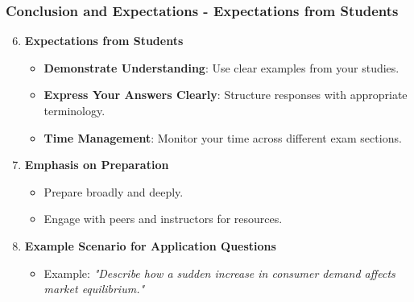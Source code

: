 \documentclass[aspectratio=169]{beamer}
\begin{document}
\begin{frame}[fragile]
    \frametitle{Conclusion and Expectations - Expectations from Students}
    \begin{enumerate}
        \setcounter{enumi}{5} %
        \item \textbf{Expectations from Students}
        \begin{itemize}
            \item \textbf{Demonstrate Understanding}: Use clear examples from your studies.
            \item \textbf{Express Your Answers Clearly}: Structure responses with appropriate terminology.
            \item \textbf{Time Management}: Monitor your time across different exam sections.
        \end{itemize}

        \item \textbf{Emphasis on Preparation}
        \begin{itemize}
            \item Prepare broadly and deeply.
            \item Engage with peers and instructors for resources.
        \end{itemize}
        
        \item \textbf{Example Scenario for Application Questions}
        \begin{itemize}
            \item Example: \textit{"Describe how a sudden increase in consumer demand affects market equilibrium."}
        \end{itemize}
    \end{enumerate}
\end{frame}
\end{document}
